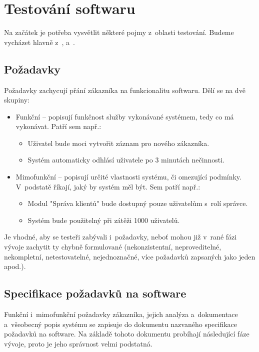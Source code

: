 \chapter{Testování softwaru}
Na začátek je potřeba vysvětlit některé pojmy z~oblasti testování. Budeme vycházet hlavně z~\citep{RizeniKvalitySW}, \citep{Patton} a~\citep{Herout}.

	\section{Požadavky}
	Požadavky zachycují přání zákazníka na funkcionalitu softwaru. Dělí se na dvě skupiny:
		\begin{itemize}
			\item Funkční -- popisují funkčnost služby vykonávané systémem, tedy co má vykonávat. Patří sem např.:
				\begin{itemize}
					\item Uživatel bude moci vytvořit záznam pro nového zákazníka.
					\item Systém automaticky odhlásí uživatele po 3 minutách nečinnosti.
				\end{itemize}
			\item Mimofunkční -- popisují určité vlastnosti systému, či omezující podmínky. V~podstatě říkají, jaký by systém měl být. Sem patří např.:
				\begin{itemize}
					\item Modul "Správa klientů" bude dostupný pouze uživatelům s~rolí správce.
					\item Systém bude použitelný při zátěži 1000 uživatelů.
				\end{itemize}
		\end{itemize}
	
	Je vhodné, aby se testeři zabývali i~požadavky, neboť mohou již v~rané fázi vývoje zachytit ty chybně formulované (nekonzistentní, neproveditelné, nekompletní, netestovatelné, nejednoznačné, více požadavků zapsaných jako jeden apod.).
	
	\section{Specifikace požadavků na software}
	Funkční i~mimofunkční požadavky zákazníka, jejich analýza a~dokumentace a~všeobecný popis systému se zapisuje do dokumentu nazvaného specifikace požadavků na software. Na základě tohoto dokumentu probíhají následující fáze vývoje, proto je jeho správnost velmi podstatná.
	
